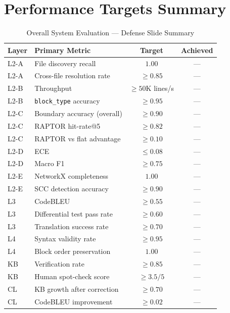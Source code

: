 \documentclass[11pt,a4paper]{article}
\begin{document}
\section{Performance Targets Summary}

\begin{table}[H]
\centering
\caption{Overall System Evaluation — Defense Slide Summary}
\renewcommand{\arraystretch}{1.25}
\small
\begin{tabularx}{\textwidth}{@{} l L{4cm} c c @{}}
\toprule
\textbf{Layer} & \textbf{Primary Metric} & \textbf{Target} & \textbf{Achieved} \\
\midrule
L2-A & File discovery recall & $1.00$ & — \\
L2-A & Cross-file resolution rate & $\geq 0.85$ & — \\
L2-B & Throughput & $\geq 50$K lines/s & — \\
L2-B & \texttt{block\_type} accuracy & $\geq 0.95$ & — \\
L2-C & Boundary accuracy (overall) & $\geq 0.90$ & — \\
L2-C & RAPTOR hit-rate@5 & $\geq 0.82$ & — \\
L2-C & RAPTOR vs flat advantage & $\geq 0.10$ & — \\
L2-D & ECE & $\leq 0.08$ & — \\
L2-D & Macro F1 & $\geq 0.75$ & — \\
L2-E & NetworkX completeness & $1.00$ & — \\
L2-E & SCC detection accuracy & $\geq 0.90$ & — \\
L3 & CodeBLEU & $\geq 0.55$ & — \\
L3 & Differential test pass rate & $\geq 0.60$ & — \\
L3 & Translation success rate & $\geq 0.70$ & — \\
L4 & Syntax validity rate & $\geq 0.95$ & — \\
L4 & Block order preservation & $1.00$ & — \\
KB & Verification rate & $\geq 0.85$ & — \\
KB & Human spot-check score & $\geq 3.5/5$ & — \\
CL & KB growth after correction & $\geq 0.70$ & — \\
CL & CodeBLEU improvement & $\geq 0.02$ & — \\
\bottomrule
\end{tabularx}
\end{table}
\end{document}
